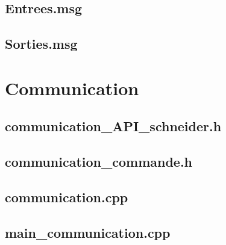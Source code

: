 \documentclass[a4paper,french, titlepage]{book}
\begin{document}
	\subsection{Entrees.msg\label{annexe_packages_automates_msg_entree}}
	
	
	
	\subsection{Sorties.msg\label{annexe_packages_automates_msg_sorties}}
	
	
	
	

\section{Communication\label{annexe_packages_communication}}

	\subsection{communication\_API\_schneider.h}
	
	

	\subsection{communication\_commande.h}
	
	

	\subsection{communication.cpp}
	
	

	\subsection{main\_communication.cpp\label{annexe_main_communication}}
	
	
	






	
\end{document}
